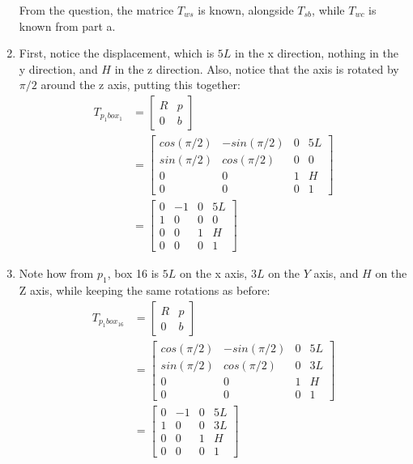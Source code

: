 \documentclass{article}
\begin{document}
\begin{enumerate}
From the question, the matrice $T_{ws}$ is known, alongside $T_{sb}$, while $T_{wc}$ is known from part a.
\item First, notice the displacement, which is $5L$ in the x direction, nothing in the y direction, and $H$ in the z direction. Also, notice that the axis is rotated by $\pi/2$ around the z axis, putting this together:
\begin{align}
            T_{p_1box_1} &= \begin{bmatrix}
R & p \\
0 & b 
\end{bmatrix}\\
&= \begin{bmatrix}
cos(\pi/2) & -sin(\pi/2)& 0 & 5L \\
sin(\pi/2) & cos(\pi/2) & 0 & 0 \\
0 & 0 & 1& H \\
0 & 0 & 0 & 1
\end{bmatrix}\\
&= \begin{bmatrix}
0 & -1& 0 & 5L \\
1 & 0 & 0 & 0 \\
0 & 0 & 1& H \\
0 & 0 & 0 & 1
\end{bmatrix}
        \end{align}
\item Note how from $p_1$, box 16 is $5L$ on the x axis, $3L$ on the $Y$ axis, and $H$ on the Z axis, while keeping the same rotations as before:
\begin{align}
            T_{p_1box_{16}} &= \begin{bmatrix}
R & p \\
0 & b 
\end{bmatrix}\\
&= \begin{bmatrix}
cos(\pi/2) & -sin(\pi/2)& 0 & 5L \\
sin(\pi/2) & cos(\pi/2) & 0 & 3L \\
0 & 0 & 1& H \\
0 & 0 & 0 & 1
\end{bmatrix}\\
&= \begin{bmatrix}
0 & -1& 0 & 5L \\
1 & 0 & 0 & 3L \\
0 & 0 & 1& H \\
0 & 0 & 0 & 1
\end{bmatrix}
        \end{align}

\end{enumerate}
\end{document}
